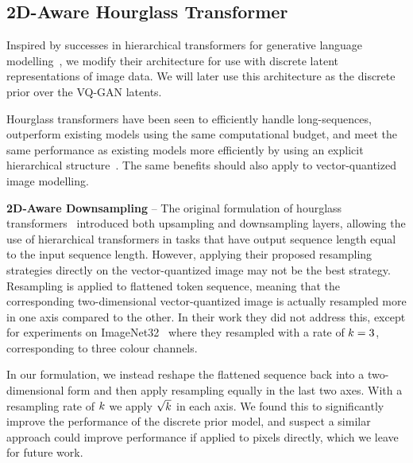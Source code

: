 \subsection{2D-Aware Hourglass Transformer}
Inspired by successes in hierarchical transformers for generative language
modelling~\cite{nawrot2021hierarchical}, we modify their architecture for use
with discrete latent representations of image data. We will later use this
architecture as the discrete prior over the VQ-GAN latents. 

Hourglass transformers have been seen to efficiently handle long-sequences,
outperform existing models using the same computational budget, and meet the
same performance as existing models more efficiently by using an explicit
hierarchical structure~\cite{nawrot2021hierarchical}. The same benefits should
also apply to vector-quantized image modelling.



\textbf{2D-Aware Downsampling} -- The original formulation of hourglass
transformers~\cite{nawrot2021hierarchical} introduced both upsampling and
downsampling layers, allowing the use of hierarchical transformers in tasks that
have output sequence length equal to the input sequence length. However,
applying their proposed resampling strategies directly on the vector-quantized
image may not be the best strategy. Resampling is applied to flattened token
sequence, meaning that the corresponding two-dimensional vector-quantized image
is actually resampled more in one axis compared to the other. In their work they
did not address this, except for experiments on
ImageNet32~\cite{russakovsky2015imagenet} where they resampled with a rate of
$k=3$, corresponding to three colour channels.

In our formulation, we instead reshape the flattened sequence back into a
two-dimensional form and then apply resampling equally in the last two axes.
With a resampling rate of $k$ we apply $\sqrt{k}$ in each axis. We found this to
significantly improve the performance of the discrete prior model, and suspect a
similar approach could improve performance if applied to pixels directly, which
we leave for future work.

